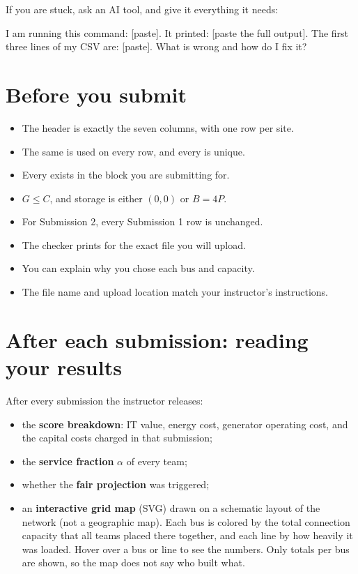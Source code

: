 \documentclass[10pt]{article}
\newcommand{\code}[1]{\path{#1}}
\begin{document}
If you are stuck, ask an AI tool, and give it everything it needs:

\begin{promptbox}
I am running this command: [paste]. It printed: [paste the full output]. The
first three lines of my CSV are: [paste]. What is wrong and how do I fix it?
\end{promptbox}

\section{Before you submit}\label{sec:checklist}

\begin{itemize}[leftmargin=*]
  \item The header is exactly the seven columns, with one row per site.
  \item The same \code{team_id} is used on every row, and every \code{site_id}
    is unique.
  \item Every \code{bus_id} exists in the block you are submitting for.
  \item $G \le C$, and storage is either $(0,0)$ or $B = 4P$.
  \item For Submission 2, every Submission 1 row is unchanged.
  \item The checker prints \code{VALID} for the exact file you will upload.
  \item You can explain why you chose each bus and capacity.
  \item The file name and upload location match your instructor's instructions.
\end{itemize}


\section{After each submission: reading your results}\label{sec:results}

After every submission the instructor releases:
\begin{itemize}[leftmargin=*]
  \item the \textbf{score breakdown}: IT value, energy cost, generator
    operating cost, and the capital costs charged in that submission;
  \item the \textbf{service fraction} $\alpha$ of every team;
  \item whether the \textbf{fair projection} was triggered;
  \item an \textbf{interactive grid map} (SVG) drawn on a schematic layout
    of the network (not a geographic map). Each bus is colored by the
    total connection capacity that all teams placed there together, and each
    line by how heavily it was loaded. Hover over a bus or line to see the
    numbers. Only totals per bus are shown, so the map does not say who built
    what.
\end{itemize}
\end{document}
